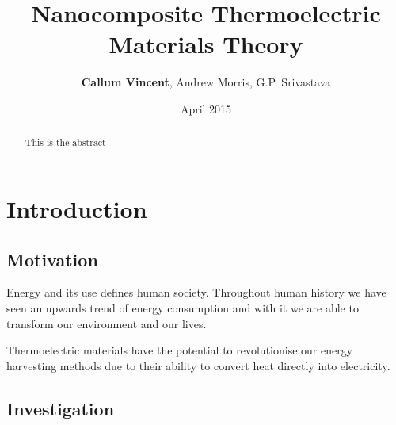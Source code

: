 \documentclass[12pt,titlepage,draft]{article}
\begin{document}
\title{Nanocomposite Thermoelectric Materials Theory}
\author{\textbf{Callum Vincent}, Andrew Morris, G.P. Srivastava}
\date{April 2015}
\maketitle

\tableofcontents

\begin{abstract}
This is the abstract

\end{abstract}

\section{Introduction}
\subsection{Motivation}


Energy and its use defines human society. Throughout human history we have seen an upwards trend of energy consumption and with it we are able to transform our environment and our lives.

Thermoelectric materials have the potential to revolutionise our energy harvesting methods due to their ability to convert heat directly into electricity.


\subsection{Investigation}


\end{document}
